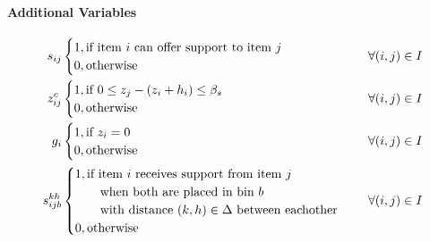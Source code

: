 \paragraph*{Additional Variables}
\begin{align*}
        s_{ij} & \begin{cases}
                        1, \text{if item $i$ can offer support to item $j$} \\ 
                        0, \text{otherwise}
                    \end{cases} & \forall (i,j) \in I \\
        z^c_{ij} & \begin{cases}
                        1, \text{if $ 0 \le z_j - (z_i + h_i) \le \beta_s$ } \\ 
                        0, \text{otherwise}
                    \end{cases} & \forall (i,j) \in I \\
        g_i & \begin{cases}
                        1, \text{if $z_i = 0$ } \\ 
                        0, \text{otherwise}
                    \end{cases} & \forall (i,j) \in I \\
        s^{kh}_{i j b} & \begin{cases}
                    1, \text{if item $i$ receives support from item $j$} \\ \qquad \text{when both are placed in bin $b$} \\ \qquad \text{with distance $(k, h) \in \Delta$ between eachother } \\ 
                    0, \text{otherwise}
                \end{cases} & \forall (i,j) \in I
\end{align*}

